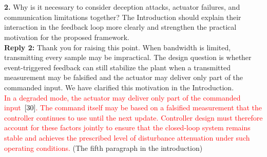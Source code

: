 \documentclass[10pt,fleqn]{article}
\begin{document}
~\\
\\
\textbf{2.} Why is it necessary to consider deception attacks, actuator failures, and communication limitations together? The Introduction should explain their interaction in the feedback loop more clearly and strengthen the practical motivation for the proposed framework.
\\[10pt]
\indent \textbf{Reply 2:} Thank you for raising this point. When bandwidth is limited, transmitting every sample may be impractical. The design question is whether event-triggered feedback can still stabilize the plant when a transmitted measurement may be falsified and the actuator may deliver only part of the commanded input. We have clarified this motivation in the Introduction.\\

\textcolor{red}{In a degraded mode, the actuator may deliver only part of the commanded input~\textcolor{black}{[30]}. The command itself may be based on a falsified measurement that the controller continues to use until the next update. Controller design must therefore account for these factors jointly to ensure that the closed-loop system remains stable and achieves the prescribed level of disturbance attenuation under such operating conditions.} (The fifth paragraph in the introduction)
\end{document}
